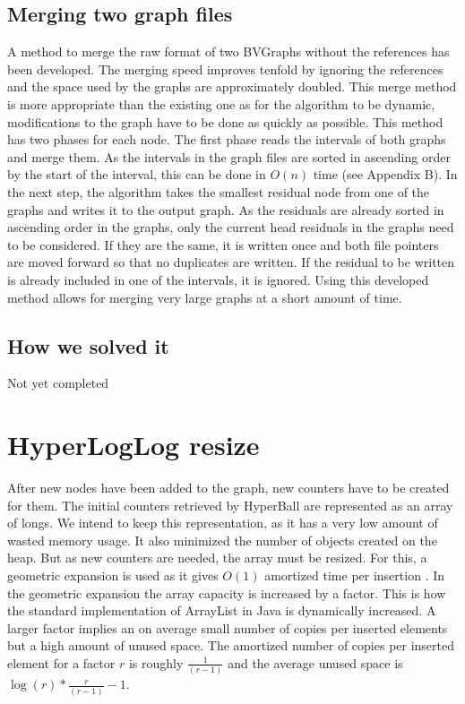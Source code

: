 \subsection{Merging two graph files}
A method to merge the raw format of two BVGraphs without the references has been developed. The merging speed improves  tenfold by ignoring the references and the space used by the graphs are approximately doubled. This merge method is more appropriate than the existing one as for the algorithm to be dynamic, modifications to the graph have to be done as quickly as possible. This method has two phases for each node. The first phase reads the intervals of both graphs and merge them. As the intervals in the graph files are sorted in ascending order by the start of the interval, this can be done in $O(n)$ time (see Appendix B). In the next step, the algorithm takes the smallest residual node from one of the graphs and writes it to the output graph. As the residuals are already sorted in ascending order in the graphs, only the current head residuals in the graphs need to be considered. If they are the same, it is written once and both file pointers are moved forward so that no duplicates are written. If the residual to be written is already included in one of the intervals, it is ignored. Using this developed method allows for merging very large graphs at a short amount of time.

\subsection{How we solved it}
Not yet completed

\section{HyperLogLog resize}
After new nodes have been added to the graph, new counters have to be created for them. The initial counters retrieved by HyperBall are represented as an array of longs. We intend to keep this representation, as it has a very low amount of wasted memory usage. It also minimized the number of objects created on the heap. But as new counters are needed, the array must be resized. For this, a geometric expansion is used as it gives $O(1)$ amortized time per insertion \cite{dynamicarrays}. In the geometric expansion the array capacity is increased by a factor. This is how the standard implementation of ArrayList in Java is dynamically increased. A larger factor implies an on average small number of copies per inserted elements but a high amount of unused space. The amortized number of copies per inserted element for a factor $r$ is roughly $\frac{1}{(r-1)}$ and the average unused space is $\log(r)*\frac{r}{(r-1)} - 1$. \cite{dynamicarrays}

